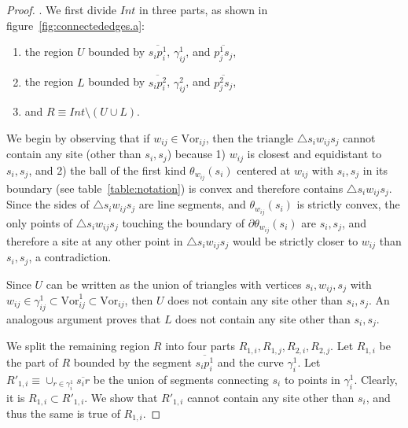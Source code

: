 \documentclass[11pt]{article}
\newcommand{\Vor}{\text{Vor}}
\begin{document}
\begin{proof}
\vspace*{0.1in}.
We first divide $Int$ in three parts, as shown in figure~\ref{fig:connectededges.a}: 
\begin{enumerate}
	\item the region $U$ bounded by $\overline{s_i p^1_i}$, $\gamma^1_{ij}$, and $\overline{p^1_j s_j}$,
	\item the region $L$ bounded by $\overline{s_i p^2_i}$, $\gamma^2_{ij}$, and $\overline{p^2_j s_j}$, 
	\item and $R\equiv Int \setminus \left(U \cup L\right)$.
\end{enumerate}
We begin by observing that if $w_{ij}\in \Vor_{ij}$, then the triangle $\triangle{s_i w_{ij} s_j}$ 
	cannot contain any site (other than $s_i,s_j$)
	because 1) $w_{ij}$ is closest and equidistant to $s_i,s_j$,
	and 2) the ball of the first kind $\theta_{w_{ij}}(s_i)$ 
	centered at $w_{ij}$ with $s_i,s_j$ in its boundary (see table~\ref{table:notation}) 
	is convex and therefore contains $\triangle{s_i w_{ij} s_j}$. 
Since the sides of $\triangle{s_i w_{ij} s_j}$ are line segments, and $\theta_{w_{ij}}(s_i)$ is strictly convex, 
	the only points of $\triangle{s_i w_{ij} s_j}$ touching the boundary of $\partial\theta_{w_{ij}}(s_i)$
	are $s_i,s_j$, and therefore a site at any other point in $\triangle{s_i w_{ij} s_j}$ would be strictly closer to $w_{ij}$ than $s_i,s_j$, 
	a contradiction. 



Since $U$ can be written as the union of triangles with vertices $s_i,w_{ij},s_j$ with $w_{ij}\in\gamma^1_{ij}\subset\Vor^1_{ij}\subset\Vor_{ij}$, 
	then $U$ does not contain any site other than $s_i,s_j$. 
An analogous argument proves that $L$ does not contain any site other than $s_i,s_j$.



We split the remaining region $R$ into four parts $R_{1,i},R_{1,j},R_{2,i},R_{2,j}$. Let $R_{1,i}$ be the part of $R$ bounded by the segment $\overline{s_i p^1_i}$ and the curve $\gamma^1_i$. 
Let $R'_{1,i} \equiv \displaystyle{\cup_{r\in \gamma^1_i} \overline{s_i r}}$ be the union of segments connecting $s_i$ to points in $\gamma^1_i$. 
Clearly, it is $R_{1,i}\subset R'_{1,i}$. We show that $R'_{1,i}$ cannot contain any site other than $s_i$, 
	and thus the same is true of $R_{1,i}$. 




\end{proof}
\end{document}
